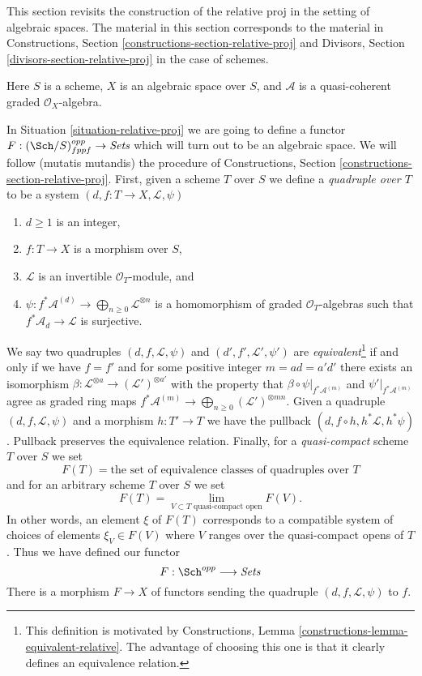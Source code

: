 \noindent
This section revisits the construction of the relative proj
in the setting of algebraic spaces. The material in this section
corresponds to the material in Constructions, Section
\ref{constructions-section-relative-proj}
and Divisors, Section \ref{divisors-section-relative-proj}
in the case of schemes.

\begin{situation}
\label{situation-relative-proj}
Here $S$ is a scheme, $X$ is an algebraic space over $S$, and
$\mathcal{A}$ is a quasi-coherent graded $\mathcal{O}_X$-algebra.
\end{situation}

\noindent
In Situation \ref{situation-relative-proj} we are going to define
a functor $F : (\Sch/S)_{fppf}^{opp} \to \textit{Sets}$ which will
turn out to be an algebraic space. We will follow (mutatis mutandis)
the procedure of
Constructions, Section \ref{constructions-section-relative-proj}.
First, given a scheme $T$ over $S$ we define a
{\it quadruple over $T$} to be a system
$(d, f : T \to X, \mathcal{L}, \psi)$
\begin{enumerate}
\item $d \geq 1$ is an integer,
\item $f : T \to X$ is a morphism over $S$,
\item $\mathcal{L}$ is an invertible $\mathcal{O}_T$-module, and
\item
$\psi : f^*\mathcal{A}^{(d)} \to \bigoplus_{n \geq 0}\mathcal{L}^{\otimes n}$
is a homomorphism of graded $\mathcal{O}_T$-algebras
such that $f^*\mathcal{A}_d \to \mathcal{L}$ is surjective.
\end{enumerate}
We say two quadruples $(d, f, \mathcal{L}, \psi)$ and
$(d', f', \mathcal{L}', \psi')$ are {\it equivalent}\footnote{This
definition is motivated by
Constructions, Lemma \ref{constructions-lemma-equivalent-relative}.
The advantage of choosing this one is that it clearly defines
an equivalence relation.}
if and only if
we have $f = f'$ and for some positive integer $m = ad = a'd'$
there exists an isomorphism
$\beta : \mathcal{L}^{\otimes a} \to (\mathcal{L}')^{\otimes a'}$
with the property that $\beta \circ \psi|_{f^*\mathcal{A}^{(m)}}$
and $\psi'|_{f^*\mathcal{A}^{(m)}}$ agree
as graded ring maps
$f^*\mathcal{A}^{(m)} \to \bigoplus_{n \geq 0} (\mathcal{L}')^{\otimes mn}$.
Given a quadruple $(d, f, \mathcal{L}, \psi)$
and a morphism $h : T' \to T$ we have the pullback
$(d, f \circ h, h^*\mathcal{L}, h^*\psi)$. Pullback preserves 
the equivalence relation. Finally, for a {\it quasi-compact} scheme $T$
over $S$ we set
$$
F(T) = \text{the set of equivalence classes of quadruples over }T
$$
and for an arbitrary scheme $T$ over $S$ we set
$$
F(T)
=
\lim_{V \subset T\text{ quasi-compact open}} F(V).
$$
In other words, an element $\xi$ of $F(T)$ corresponds to a compatible
system of choices of elements $\xi_V \in F(V)$ where $V$ ranges over the
quasi-compact opens of $T$. Thus we have defined our functor
\begin{equation}
\label{equation-proj}
F : \Sch^{opp} \longrightarrow \textit{Sets}
\end{equation}
There is a morphism $F \to X$ of functors sending the quadruple
$(d, f, \mathcal{L}, \psi)$ to $f$.

